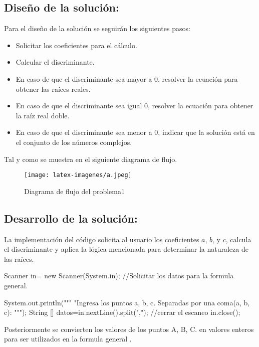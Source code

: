 \subsection{\textbf{Diseño de la solución:}}

Para el diseño de la solución se seguirán los siguientes pasos:
\begin{itemize}
    \item Solicitar los coeficientes para el cálculo.
    \item Calcular el discriminante.
    \item En caso de que el discriminante sea mayor a 0, resolver la ecuación para obtener las raíces reales.
    \item En caso de que el discriminante sea igual 0, resolver la ecuación para obtener la raíz real doble.
    \item En caso de que el discriminante sea menor a 0, indicar que la solución está en el conjunto de los números complejos.
\end{itemize}

Tal y como se muestra en el siguiente diagrama de flujo.

\begin{figure}[h!]
    \centering
    \texttt{[image: latex-imagenes/a.jpeg]}
    \caption{Diagrama de flujo del problema1}
    \label{fig:Diagramadeflujodel problema1}
\end{figure}

\subsection{\textbf{Desarrollo de la solución:}}
La implementación del código solicita al usuario los coeficientes \(a\), \(b\), y \(c\), calcula el discriminante y aplica la lógica mencionada para determinar la naturaleza de las raíces. 
\begin{javaCode}
 Scanner in= new Scanner(System.in);
        //Solicitar los datos para la formula general.
        
        System.out.println("""
                           "Ingresa los puntos a, b, c.
                           Separadas por una coma(a, b, c): 
                           """);
        String [] datos=in.nextLine().split(",");
        //cerrar el escaneo
        in.close();
        
\end{javaCode}
Posteriormente se convierten los valores de los puntos A, B, C. en valores enteros para ser utilizados  en la formula general .

